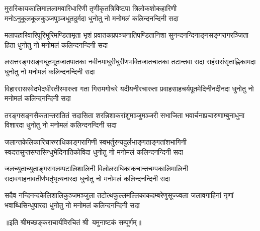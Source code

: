 
\fourlineindentedshloka
{मुरारिकायकालिमाललामवारिधारिणी}
{तृणीकृतत्रिविष्टपा त्रिलोकशोकहारिणी}
{मनोऽनुकूलकूलकुञ्जपुञ्जधूतदुर्मदा}
{धुनोतु नो मनोमलं कलिन्दनन्दिनी सदा}%

\fourlineindentedshloka
{मलापहारिवारिपूरिभूरिमण्डितामृता}
{भृशं प्रवातकप्रपञ्चनातिपण्डितानिशा}
{सुनन्दनन्दिनाङ्गसङ्गरागरञ्जिता हिता}
{धुनोतु नो मनोमलं कलिन्दनन्दिनी सदा}%

\fourlineindentedshloka
{लसत्तरङ्गसङ्गधूतभूतजातपातका}
{नवीनमाधुरीधुरीणभक्तिजातचातका}
{तटान्तवा  सदा  सहंससंसृताह्निकामदा} 
{धुनोतु नो मनोमलं कलिन्दनन्दिनी सदा}%

\fourlineindentedshloka
{विहाररासस्वेदभेदधीरतीरमारुता}
{गता गिरामगोचरे यदीयनीरचारुता}
{प्रवाहसाहचर्यपूतमेदिनीनदीनदा}
{धुनोतु नो मनोमलं कलिन्दनन्दिनी सदा}%

\fourlineindentedshloka
{तरङ्गसङ्गसैकतान्तरातितं सदासिता}
{शरन्निशाकरांशुमञ्जुमञ्जरी सभाजिता}
{भवार्चनाप्रचारुणाम्बुनाधुना विशारदा}
{धुनोतु नो मनोमलं कलिन्दनन्दिनी सदा}%

\fourlineindentedshloka
{जलान्तकेलिकारिचारुराधिकाङ्गरागिणी}
{स्वभर्तुरन्यदुर्लभाङ्गताङ्गतांशभागिनी}
{स्वदत्तसुप्तसप्तसिन्धुभेदिनातिकोविदा}
{धुनोतु नो मनोमलं कलिन्दनन्दिनी सदा}%

\fourlineindentedshloka
{जलच्युताच्युताङ्गरागलम्पटालिशालिनी}
{विलोलराधिकाकचान्तचम्पकालिमालिनी}
{सदावगाहनावतीर्णभर्तृभृत्यनारदा}
{धुनोतु नो मनोमलं कलिन्दनन्दिनी सदा}%

\fourlineindentedshloka
{सदैव नन्दिनन्दकेलिशालिकुञ्जमञ्जुला}
{तटोत्थफुल्लमल्लिकाकदम्बरेणुसूज्ज्वला}
{जलावगाहिनां नृणां भवाब्धिसिन्धुपारदा}
{धुनोतु नो मनोमलं कलिन्दनन्दिनी सदा}%

॥इति श्रीमच्छङ्कराचार्यविरचितं श्री~यमुनाष्टकं सम्पूर्णम्॥
